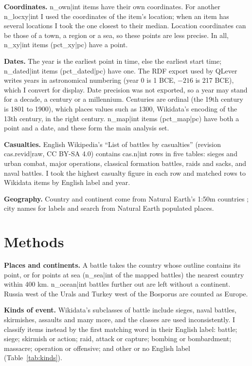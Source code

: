 \documentclass[11pt,a4paper]{article}
\begin{document}
\textbf{Coordinates.} {{n_own|int}} items have their own coordinates. For another {{n_locxy|int}} I used the coordinates of the item's location; when an item has several locations I took the one closest to their median. Location coordinates can be those of a town, a region or a sea, so these points are less precise. In all, {{n_xy|int}} items ({{pct_xy|pc}}) have a point.

\textbf{Dates.} The year is the earliest point in time, else the earliest start time; {{n_dated|int}} items ({{pct_dated|pc}}) have one. The RDF export used by QLever writes years in astronomical numbering (year 0 is 1 BCE, $-216$ is 217 BCE), which I convert for display. Date precision was not exported, so a year may stand for a decade, a century or a millennium. Centuries are ordinal (the 19th century is 1801 to 1900), which places values such as 1300, Wikidata's encoding of the 13th century, in the right century. {{n_map|int}} items ({{pct_map|pc}}) have both a point and a date, and these form the main analysis set.

\textbf{Casualties.} English Wikipedia's ``List of battles by casualties'' (revision {{cas.revid|raw}}, CC BY-SA 4.0) contains {{cas.n|int}} rows in five tables: sieges and urban combat, major operations, classical formation battles, raids and sacks, and naval battles. I took the highest casualty figure in each row and matched rows to Wikidata items by English label and year.

\textbf{Geography.} Country and continent come from Natural Earth's 1:50m countries \citep{naturalearth}; city names for labels and search from Natural Earth populated places.

\section{Methods}
\textbf{Places and continents.} A battle takes the country whose outline contains its point, or for points at sea ({{n_sea|int}} of the mapped battles) the nearest country within 400 km. {{n_ocean|int}} battles further out are left without a continent. Russia west of the Urals and Turkey west of the Bosporus are counted as Europe.

\textbf{Kinds of event.} Wikidata's subclasses of battle include sieges, naval battles, skirmishes, assaults and many more, and the classes are used inconsistently. I classify items instead by the first matching word in their English label: battle; siege; skirmish or action; raid, attack or capture; bombing or bombardment; massacre; operation or offensive; and other or no English label (Table~\ref{tab:kinds}).
\end{document}
